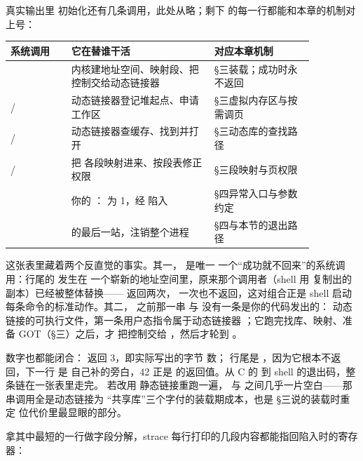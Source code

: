 真实输出里  初始化还有几条调用，此处从略；剩下
的每一行都能和本章的机制对上号：

\begin{longtable}{L{0.17\linewidth}L{0.4\linewidth}L{0.29\linewidth}}
\toprule
系统调用 & 它在替谁干活 & 对应本章机制 \\
\midrule
{} & 内核建地址空间、映射段、把控制交给动态链接器 & §三装载；成功时永不返回 \\
/ & 动态链接器登记堆起点、申请工作区 & §三虚拟内存区与按需调页 \\
/ & 动态链接器查缓存、找到并打开  & §三动态库的查找路径 \\
/ & 把  各段映射进来、按段表修正权限 & §三段映射与页权限 \\
 & 你的 ： 为 1，经  陷入 & §四异常入口与参数约定 \\
 &  的最后一站，注销整个进程 & §四与本节的退出路径 \\
\bottomrule
\end{longtable}

这张表里藏着两个反直觉的事实。其一， 是唯一
一个“成功就不回来”的系统调用：行尾的  发生在
一个崭新的地址空间里，原来那个调用者（shell 用
 复制出的副本）已经被整体替换——
返回两次， 一次也不返回，这对组合正是 shell
启动每条命令的标准动作。其二， 之前那一串
 与  没有一条是你的代码发出的：
动态链接的可执行文件，第一条用户态指令属于动态链接器
；它跑完找库、映射、准备 GOT（§三）之后，才
把控制交给 ，然后才轮到 。

数字也都能闭合： 返回 3，即实际写出的字节
数； 行尾是 ，因为它根本不返
回，下一行  是 
自己补的旁白，42 正是  的返回值。从 C 的
 到 shell 的退出码，整条链在一张表里走完。
若改用  静态链接重跑一遍， 与
 之间几乎一片空白——那串调用全是动态链接为
“共享库”三个字付的装载期成本，也是 §三说的装载时重定
位代价里最显眼的部分。

拿其中最短的一行做字段分解，strace 每行打印的几段内容都能指回陷入时的寄存器：

